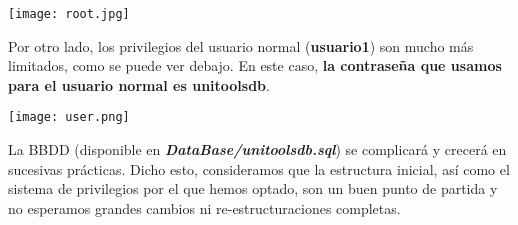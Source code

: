 \documentclass[12pt]{report}
\begin{document}
\texttt{[image: root.jpg]}

Por otro lado, los privilegios del usuario normal (\textbf{usuario1}) son mucho más limitados, como se puede ver debajo. En este caso,\textbf{ la contraseña que usamos para el usuario normal es unitoolsdb}.

\texttt{[image: user.png]}

La BBDD (disponible en \textbf{\textit{DataBase/unitoolsdb.sql}}) se complicará y crecerá en sucesivas prácticas. Dicho esto, consideramos que la estructura inicial, así como el sistema de privilegios por el que hemos optado, son un buen punto de partida y no esperamos grandes cambios ni re-estructuraciones completas.
\end{document}
